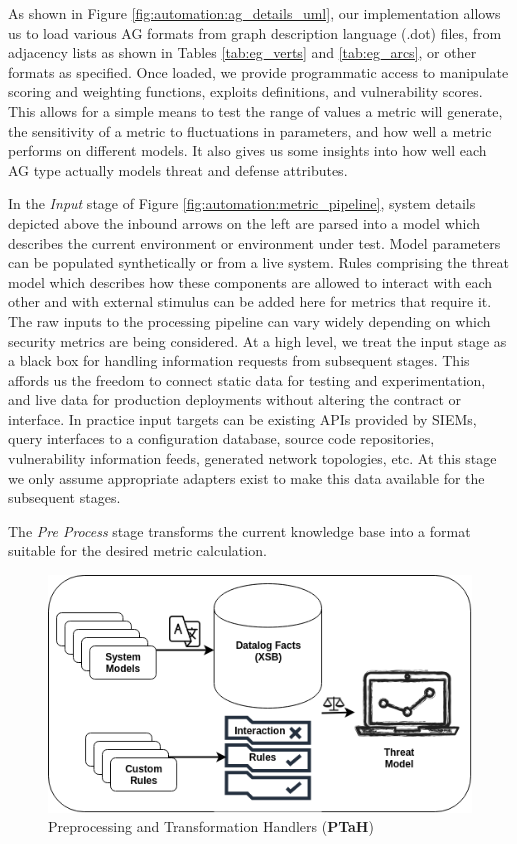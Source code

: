 As shown in Figure \ref{fig:automation:ag_details_uml}, our implementation allows us to load various AG formats from graph description language (.dot) files, from adjacency lists as shown in Tables \ref{tab:eg_verts} and \ref{tab:eg_arcs}, or other formats as specified. Once loaded, we provide programmatic access to manipulate scoring and weighting functions, exploits definitions, and vulnerability scores. This allows for a simple means to test the range of values a metric will generate, the sensitivity of a metric to fluctuations in parameters, and how well a metric performs on different models. It also gives us some insights into how well each AG type actually models threat and defense attributes.


In the \textit{Input} stage of Figure \ref{fig:automation:metric_pipeline}, system details depicted above the inbound arrows on the left are parsed into a model which describes the current environment or environment under test. Model parameters can be populated synthetically or from a live system. Rules comprising the threat model which describes how these components are allowed to interact with each other and with external stimulus can be added here for metrics that require it. The raw inputs to the processing pipeline can vary widely depending on which security metrics are being considered. At a high level, we treat the input stage as a black box for handling information requests from subsequent stages. This affords us the freedom to connect static data for testing and experimentation, and live data for production deployments without altering the contract or interface. In practice input targets can be existing APIs provided by SIEMs, query interfaces to a configuration database, source code repositories, vulnerability information feeds, generated network topologies, etc. At this stage we only assume appropriate adapters exist to make this data available for the subsequent stages.

The \textit{Pre Process} stage transforms the current knowledge base into a format suitable for the desired metric calculation. 

\begin{figure}[ht]
\centering
\includegraphics[width=.5\linewidth]{resource/img/ch_benchmarking/secmet_ptah/Ptah_archs.png}
\caption{Preprocessing and Transformation Handlers (\textbf{PTaH})}
\label{fig:automation:ptah_arch}
\end{figure} 


